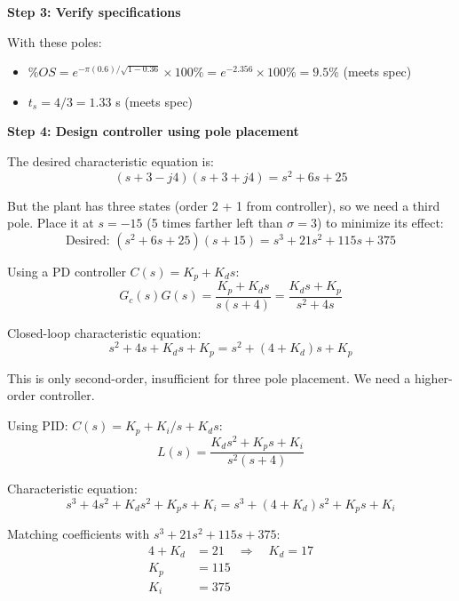 \textbf{Step 3: Verify specifications}

With these poles:
\begin{itemize}
    \item $\%OS = e^{-\pi(0.6)/\sqrt{1-0.36}} \times 100\% = e^{-2.356} \times 100\% = 9.5\%$ (meets spec)
    \item $t_s = 4/3 = 1.33$ s (meets spec)
\end{itemize}

\textbf{Step 4: Design controller using pole placement}

The desired characteristic equation is:
\begin{equation}
    (s + 3 - j4)(s + 3 + j4) = s^2 + 6s + 25
\end{equation}

But the plant has three states (order 2 + 1 from controller), so we need a third pole. Place it at $s = -15$ (5 times farther left than $\sigma = 3$) to minimize its effect:
\begin{equation}
    \text{Desired: } (s^2 + 6s + 25)(s + 15) = s^3 + 21s^2 + 115s + 375
\end{equation}

Using a PD controller $C(s) = K_p + K_d s$:
\begin{equation}
    G_c(s)G(s) = \frac{K_p + K_d s}{s(s+4)} = \frac{K_d s + K_p}{s^2 + 4s}
\end{equation}

Closed-loop characteristic equation:
\begin{equation}
    s^2 + 4s + K_d s + K_p = s^2 + (4 + K_d)s + K_p
\end{equation}

This is only second-order, insufficient for three pole placement. We need a higher-order controller.

Using PID: $C(s) = K_p + K_i/s + K_d s$:
\begin{equation}
    L(s) = \frac{K_d s^2 + K_p s + K_i}{s^2(s+4)}
\end{equation}

Characteristic equation:
\begin{equation}
    s^3 + 4s^2 + K_d s^2 + K_p s + K_i = s^3 + (4 + K_d)s^2 + K_p s + K_i
\end{equation}

Matching coefficients with $s^3 + 21s^2 + 115s + 375$:
\begin{align}
    4 + K_d &= 21 \quad \Rightarrow \quad K_d = 17 \\
    K_p &= 115 \\
    K_i &= 375
\end{align}

